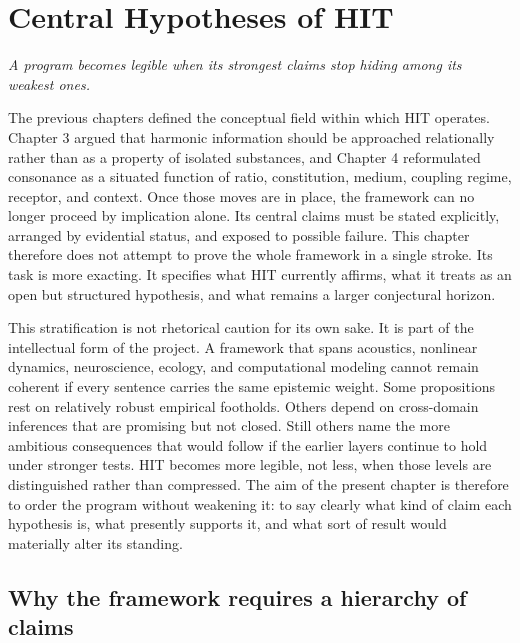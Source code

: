 \chapter{Central Hypotheses of HIT}

\epigraph{\emph{A program becomes legible when its strongest claims stop hiding among its weakest ones.}}{}

The previous chapters defined the conceptual field within which HIT operates. Chapter 3 argued that harmonic information should be approached relationally rather than as a property of isolated substances, and Chapter 4 reformulated consonance as a situated function of ratio, constitution, medium, coupling regime, receptor, and context. Once those moves are in place, the framework can no longer proceed by implication alone. Its central claims must be stated explicitly, arranged by evidential status, and exposed to possible failure. This chapter therefore does not attempt to prove the whole framework in a single stroke. Its task is more exacting. It specifies what HIT currently affirms, what it treats as an open but structured hypothesis, and what remains a larger conjectural horizon.

This stratification is not rhetorical caution for its own sake. It is part of the intellectual form of the project. A framework that spans acoustics, nonlinear dynamics, neuroscience, ecology, and computational modeling cannot remain coherent if every sentence carries the same epistemic weight. Some propositions rest on relatively robust empirical footholds. Others depend on cross-domain inferences that are promising but not closed. Still others name the more ambitious consequences that would follow if the earlier layers continue to hold under stronger tests. HIT becomes more legible, not less, when those levels are distinguished rather than compressed. The aim of the present chapter is therefore to order the program without weakening it: to say clearly what kind of claim each hypothesis is, what presently supports it, and what sort of result would materially alter its standing.

\section{Why the framework requires a hierarchy of claims}

